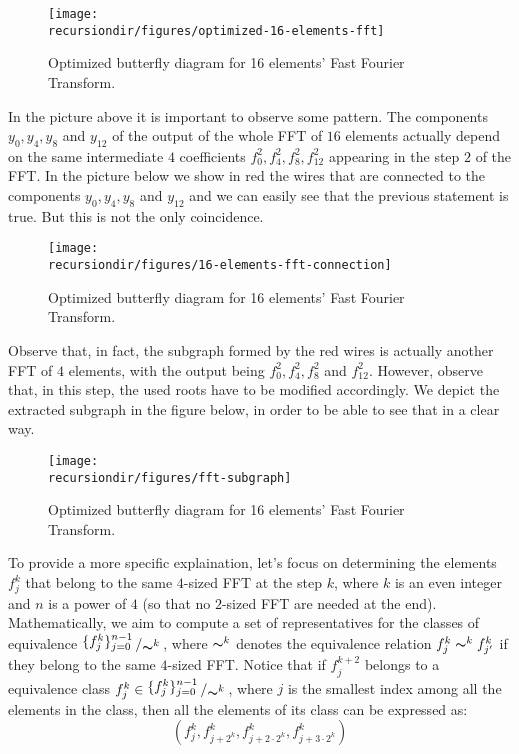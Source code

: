 \begin{figure}[H]
\centering
\texttt{[image: \\recursiondir/figures/optimized-16-elements-fft]}
\caption{Optimized butterfly diagram for 16 elements' Fast Fourier Transform.}
\label{fig:c12a-proof}
\end{figure}


In the picture above it is important to observe some pattern. The components $y_0, y_4, y_8$ and $y_{12}$ of the output of the whole FFT of $16$ elements actually depend on the same intermediate $4$ coefficients $f_0^2, f_4^2, f_8^2, f_{12}^2$ appearing in the step $2$ of the FFT. In the picture below we show in red the wires that are connected to the components $y_0, y_4, y_8$ and $y_{12}$ and we can easily see that the previous statement is true. But this is not the only coincidence. 

\begin{figure}[H]
\centering
\texttt{[image: \\recursiondir/figures/16-elements-fft-connection]}
\caption{Optimized butterfly diagram for 16 elements' Fast Fourier Transform.}
\label{fig:c12a-proof}
\end{figure}

Observe that, in fact, the subgraph formed by the red wires is actually another FFT of $4$ elements, with the output being $f_0^2, f_4^2, f_8^2$ and $f_{12}^2$. However, observe that, in this step, the used roots have to be modified accordingly. We depict the extracted subgraph in the figure below, in order to be able to see that in a clear way. 

\begin{figure}[H]
\centering
\texttt{[image: \\recursiondir/figures/fft-subgraph]}
\caption{Optimized butterfly diagram for 16 elements' Fast Fourier Transform.}
\label{fig:c12a-proof}
\end{figure}

\newcommand{\bigslant}[2]{{\raisebox{.2em}{$#1$}\left/\raisebox{-.2em}{$#2$}\right.}}

To provide a more specific explaination, let's focus on determining the elements $f_j^k$ that belong to the same $4$-sized FFT at the step $k$, where $k$ is an even integer and $n$ is a power of $4$ (so that no $2$-sized FFT are needed at the end). Mathematically, we aim to compute a set of representatives for the classes of equivalence $\bigslant{\{f^k_j\}_{j=0}^{n-1}}{\thicksim^k}$, where $\thicksim^k$ denotes the equivalence relation $f_{j}^k \thicksim^k f_{j'}^k$ if they belong to the same $4$-sized FFT. Notice that if $f_j^{k+2}$ belongs to a equivalence class $f_j^k \in \bigslant{\{f^k_j\}_{j=0}^{n-1}}{\thicksim^k}$, where $j$ is the smallest index among all the elements in the class, then all the elements of its class can be expressed as:
\[
\left( f_{j}^{k}, f_{j + 2^{k} }^{k}, f_{j + 2 \cdot 2^{k}}^{k}, f_{j + 3 \cdot 2^{k}} ^{k} \right) 
\]


